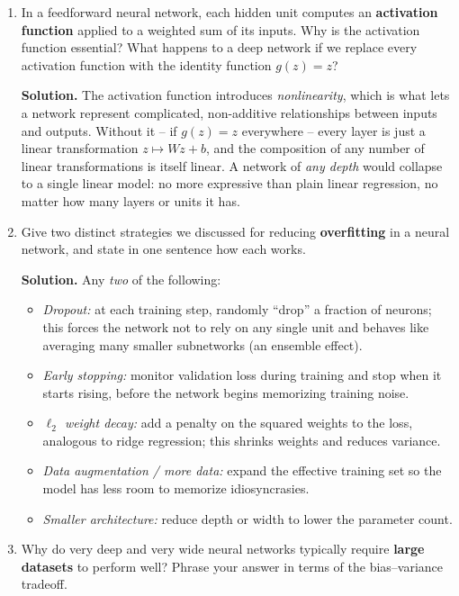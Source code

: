 \documentclass[11pt]{article}
\newcommand{\solution}[1]{%
  \par\medskip\noindent\textbf{Solution.} #1\par\medskip
}
\begin{document}
\begin{enumerate}[leftmargin=*, resume]

\item In a feedforward neural network, each hidden unit computes an \textbf{activation function} applied to a weighted sum of its inputs. Why is the activation function essential? What happens to a deep network if we replace every activation function with the identity function $g(z) = z$?

\solution{The activation function introduces \emph{nonlinearity}, which is what lets a network represent complicated, non-additive relationships between inputs and outputs. Without it -- if $g(z) = z$ everywhere -- every layer is just a linear transformation $z \mapsto Wz + b$, and the composition of any number of linear transformations is itself linear. A network of \emph{any depth} would collapse to a single linear model: no more expressive than plain linear regression, no matter how many layers or units it has.}

\item Give two distinct strategies we discussed for reducing \textbf{overfitting} in a neural network, and state in one sentence how each works.

\solution{Any \emph{two} of the following:
\begin{itemize}
\item \emph{Dropout:} at each training step, randomly ``drop'' a fraction of neurons; this forces the network not to rely on any single unit and behaves like averaging many smaller subnetworks (an ensemble effect).
\item \emph{Early stopping:} monitor validation loss during training and stop when it starts rising, before the network begins memorizing training noise.
\item \emph{$\ell_2$ weight decay:} add a penalty on the squared weights to the loss, analogous to ridge regression; this shrinks weights and reduces variance.
\item \emph{Data augmentation / more data:} expand the effective training set so the model has less room to memorize idiosyncrasies.
\item \emph{Smaller architecture:} reduce depth or width to lower the parameter count.
\end{itemize}}

\item Why do very deep and very wide neural networks typically require \textbf{large datasets} to perform well? Phrase your answer in terms of the bias--variance tradeoff.


\end{enumerate}
\end{document}
